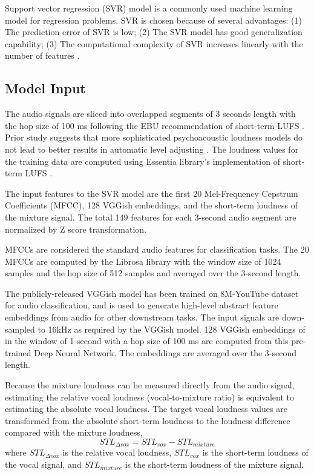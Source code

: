 \documentclass[conference]{IEEEtran}
\begin{document}
Support vector regression (SVR) model \cite{drucker1997support} is a commonly used machine learning model for regression problems. SVR is chosen because of several advantages: (1) The prediction error of SVR is low; (2) The SVR model has good generalization capability; (3) The computational complexity of SVR increases linearly with the number of features \cite{awad2015support}.


\subsection{Model Input}

The audio signals are sliced into overlapped segments of 3 seconds length with the hop size of 100 ms following the EBU recommendation of short-term LUFS \cite{ebu2011loudness}. Prior study suggests that more sophisticated psychoacoustic loudness models do not lead to better results in automatic level adjusting \cite{wichern2015comparison}. The loudness values for the training data are computed using Essentia library's implementation of short-term LUFS \cite{bogdanov2013essentia}. 

The input features to the SVR model are the first 20 Mel-Frequency Cepstrum Coefficients (MFCC), 128 VGGish \cite{hershey2017cnn} embeddings, and the short-term loudness of the mixture signal. The total 149 features for each 3-second audio segment are normalized by Z score transformation.

MFCCs are considered the standard audio features for classification tasks. The 20 MFCCs are computed by the Librosa library \cite{mcfee2015librosa} with the window size of 1024 samples and the hop size of 512 samples and averaged over the 3-second length. 

The publicly-released VGGish model \cite{hershey2017cnn} has been trained on 8M-YouTube dataset for audio classification, and is used to generate high-level abstract feature embeddings from audio for other downstream tasks. The input signals are down-sampled to 16kHz as required by the VGGish model. 128 VGGish embeddings of in the window of 1 second with a hop size of 100 ms are computed from this pre-trained Deep Neural Network. The embeddings are averaged over the 3-second length. 

Because the mixture loudness can be measured directly from the audio signal, estimating the relative vocal loudness (vocal-to-mixture ratio) is equivalent to estimating the absolute vocal loudness. The target vocal loudness values are transformed from the absolute short-term loudness to the loudness difference compared with the mixture loudness, 
\begin{equation} \label{eq1}
STL_{\Delta vox}  =  STL_{vox} - STL_{mixture}
\end{equation}
where $STL_{\Delta vox}$ is the relative vocal loudness, $STL_{vox}$ is the short-term loudness of the vocal signal, and $STL_{mixture}$ is the short-term loudness of the mixture signal. 
\end{document}
